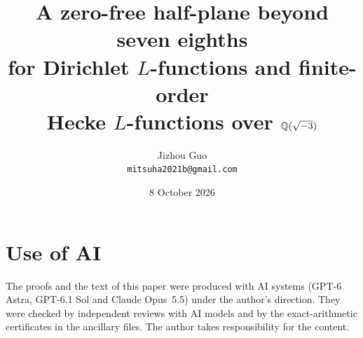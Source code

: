 \documentclass[11pt]{article}
\title{A zero-free half-plane beyond seven eighths\protect\\for Dirichlet $L$-functions and finite-order\protect\\Hecke $L$-functions over $\mathbb Q(\sqrt{-3})$}
\author{Jizhou Guo\\\texttt{mitsuha2021b@gmail.com}}
\date{8 October 2026}
\theoremstyle{definition}
\theoremstyle{remark}
\numberwithin{equation}{section}
\newcommand{\1}{\mathbf 1}
\begin{document}
\maketitle











\appendix


\begingroup\raggedright


\endgroup
\section*{Use of AI}
The proofs and the text of this paper were produced with AI systems (GPT-6 Astra, GPT-6.1 Sol and Claude Opus~5.5) under the author's direction. They were checked by independent reviews with AI models and by the exact-arithmetic certificates in the ancillary files. The author takes responsibility for the content.
\end{document}
